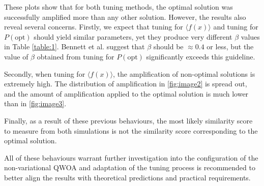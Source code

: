 These plots show that for both tuning methods, the optimal solution was successfully amplified more than any other solution. However, the results also reveal several concerns. Firstly, we expect that tuning for $\langle f(x)\rangle$ and tuning for $P(\text{opt})$ should yield similar parameters, yet they produce very different $\beta$ values in Table \ref{table:1}. Bennett et al. suggest that $\beta$ should be $\approx 0.4$ or less, but the value of $\beta$ obtained from tuning for $P(\text{opt})$ significantly exceeds this guideline.

Secondly, when tuning for $\langle f(x)\rangle$, the amplification of non-optimal solutions is extremely high. The distribution of amplification in \ref{fig:image2} is spread out, and the amount of amplification applied to the optimal solution is much lower than in \ref{fig:image3}.

Finally, as a result of these previous behaviours, the most likely similarity score to measure from both simulations is not the similarity score corresponding to the optimal solution. 

All of these behaviours warrant further investigation into the configuration of the non-variational QWOA and adaptation of the tuning process is recommended to better align the results with theoretical predictions and practical requirements.